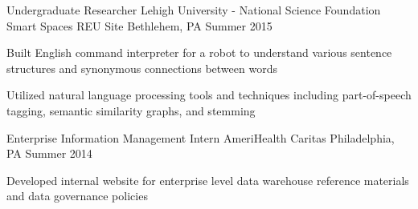 \begin{cventries}
  \cventry
    {Undergraduate Researcher} %
    {Lehigh University - National Science Foundation Smart Spaces REU Site} %
    {Bethlehem, PA} %
    {Summer 2015} %
    {
      \begin{cvitems} %
        \item {Built English command interpreter for a robot to understand various sentence structures and synonymous connections between words}
        \item {Utilized natural language processing tools and techniques including part-of-speech tagging, semantic similarity graphs, and stemming}
      \end{cvitems}
    }

  \cventry
    {Enterprise Information Management Intern} %
    {AmeriHealth Caritas} %
    {Philadelphia, PA} %
    {Summer 2014} %
    {
      \begin{cvitems} %
        \item {Developed internal website for enterprise level data warehouse reference materials and data governance policies}
      \end{cvitems}
    }
\end{cventries}
